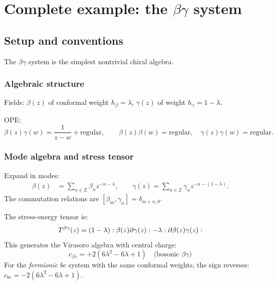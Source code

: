 \chapter{\texorpdfstring{Complete example: the $\beta\gamma$ system}{Complete example: the system}}\label{chap:beta-gamma}


\section{Setup and conventions}

The $\beta\gamma$ system is the simplest nontrivial chiral algebra.

\subsection{Algebraic structure}

Fields: $\beta(z)$ of conformal weight $h_\beta = \lambda$, $\gamma(z)$ of weight $h_\gamma = 1 - \lambda$.

OPE:
\[
\beta(z)\gamma(w) = \frac{1}{z-w} + \text{regular},
\qquad
\beta(z)\beta(w) = \text{regular}, \quad \gamma(z)\gamma(w) = \text{regular}.
\]

\subsection{Mode algebra and stress tensor}

\begin{proposition}
\label{prop:beta-gamma-modes}
Expand in modes:
\begin{align}
\beta(z) &= \sum_{n \in \mathbb{Z}} \beta_n z^{-n-\lambda},\qquad
\gamma(z) = \sum_{n \in \mathbb{Z}} \gamma_n z^{-n-(1-\lambda)}.
\end{align}
The commutation relations are $[\beta_m, \gamma_n] = \delta_{m+n,0}$.
\end{proposition}

\begin{theorem}
\label{thm:beta-gamma-stress}
The stress-energy tensor is:
\[
T^{\beta\gamma}(z) = (1-\lambda) :{\beta(z)\partial\gamma(z)}: - \lambda :{\partial\beta(z)\gamma(z)}:
\]
This generates the Virasoro algebra with central charge:
\[
c_{\beta\gamma} = +2(6\lambda^2 - 6\lambda + 1) \quad \text{(bosonic $\beta\gamma$)}
\]
For the \emph{fermionic} $bc$ system with the same conformal weights, the sign reverses:
$c_{bc} = -2(6\lambda^2 - 6\lambda + 1)$.
\end{theorem}

